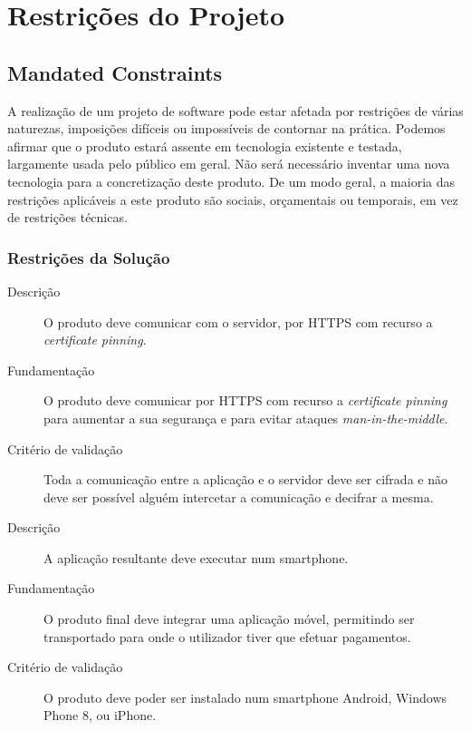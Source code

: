\documentclass[12pt,a4paper]{article}
\begin{document}
\newpage

\section{Restrições do Projeto}
  
  \subsection{Mandated Constraints}

    A realização de um projeto de software pode estar afetada por restrições de várias naturezas, imposições difíceis ou impossíveis de contornar na prática. Podemos afirmar que o produto estará assente em tecnologia existente e testada, largamente usada pelo público em geral. Não será necessário inventar uma nova tecnologia para a concretização deste produto. De um modo geral, a maioria das restrições aplicáveis a este produto são sociais, orçamentais ou temporais, em vez de restrições técnicas.

    \subsubsection{Restrições da Solução}

      \begin{description}
        \item[Descrição]O produto deve comunicar com o servidor, por HTTPS com recurso a \emph{certificate pinning}.
        \item[Fundamentação]O produto deve comunicar por HTTPS com recurso a \emph{certificate pinning} para aumentar a sua segurança e para evitar ataques \emph{man-in-the-middle}.
        \item[Critério de validação]Toda a comunicação entre a aplicação e o servidor deve ser cifrada e não deve ser possível alguém intercetar a comunicação e decifrar a mesma.
      \end{description}

\vspace{0.7cm}

      \begin{description}
        \item[Descrição]A aplicação resultante deve executar num smartphone.
        \item[Fundamentação]O produto final deve integrar uma aplicação móvel, permitindo ser transportado para onde o utilizador tiver que efetuar pagamentos.
        \item[Critério de validação]O produto deve poder ser instalado num smartphone Android, Windows Phone 8, ou iPhone.
      \end{description}
\vspace{0.7cm}
\end{document}
